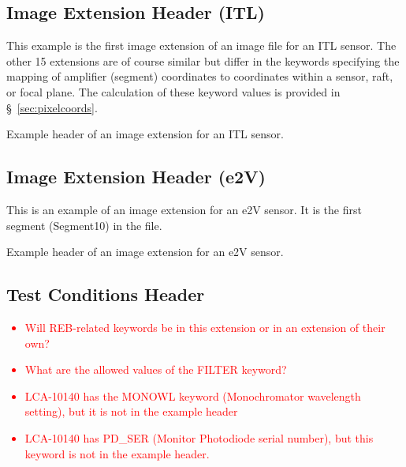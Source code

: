 \documentclass{article}[12pt]
\newcommand{\red}{\textcolor{red}}
\begin{document}
\subsection{Image Extension Header (ITL)}
This example is the first image extension of an image file for an ITL sensor.  The other 15 extensions are of course similar but differ in the keywords specifying the mapping of amplifier (segment) coordinates to coordinates within a sensor, raft, or focal plane.  The calculation of these keyword values is provided in \S~\ref{sec:pixelcoords}.

\begin{table}
\tiny
\begin{alltt}

\end{alltt}
\caption{Example header of an image extension for an ITL sensor. \label{tab:image_ITL}}
\end{table}

\subsection{Image Extension Header (e2V)}

This is an example of an image extension for an e2V sensor.  It is the first segment (Segment10) in the file.

\begin{table}
\tiny
\begin{alltt}

\end{alltt}
\caption{Example header of an image extension for an e2V sensor.\label{tab:image_e2V}}
\end{table}

\subsection{Test Conditions Header}

\red{
\begin{itemize}
\item{Will REB-related keywords be in this extension or in an extension of their own?}
\item{What are the allowed values of the FILTER keyword?}
\item{LCA-10140 has the MONOWL keyword (Monochromator wavelength setting), but it is not in the example header}
\item{LCA-10140 has PD\_SER (Monitor Photodiode serial number), but this keyword is not in the example header.}
\end{itemize}
}
\end{document}
